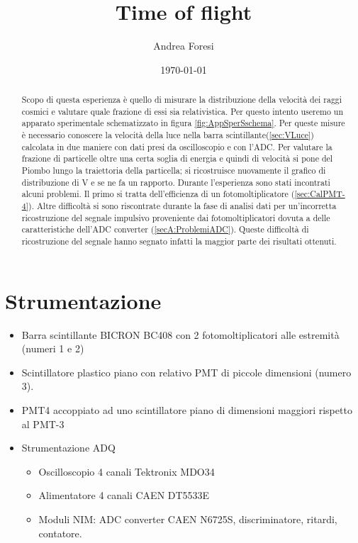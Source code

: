 \documentclass[a4paper]{article}
\title{Time of flight}
\author{Andrea Foresi}
\date{\today}
\begin{document}
\maketitle
\tableofcontents



\begin{abstract}
Scopo di questa esperienza è quello di misurare la distribuzione della velocità dei raggi cosmici e valutare quale frazione di essi sia relativistica. Per questo intento useremo un apparato sperimentale schematizzato in figura \ref{fig:AppSperSschema}. Per queste misure è necessario conoscere la velocità della luce nella barra scintillante(\ref{sec:VLuce}) calcolata in due maniere con dati presi da oscilloscopio e con l'ADC. Per valutare la frazione di particelle oltre una certa soglia di energia e quindi di velocità si pone del Piombo lungo la traiettoria della particella; si ricostruisce nuovamente il grafico di distribuzione di V e se ne fa un rapporto. Durante l'esperienza sono stati incontrati alcuni problemi. Il primo si tratta dell'efficienza di un fotomoltiplicatore (\ref{sec:CalPMT-4}). Altre difficoltà si sono riscontrate durante la fase di analisi dati per un'incorretta ricostruzione del segnale impulsivo proveniente dai fotomoltiplicatori dovuta a delle caratteristiche dell'ADC converter (\ref{secA:ProblemiADC}). Queste difficoltà di ricostruzione del segnale hanno segnato infatti la maggior parte dei risultati ottenuti.
\end{abstract}


\section{Strumentazione}
\label{sec:AppSper}
\begin{itemize}
\item Barra scintillante BICRON BC408 con 2 fotomoltiplicatori alle estremità (numeri 1 e 2)
\item Scintillatore plastico piano con relativo PMT di piccole dimensioni (numero 3). 
\item PMT4 accoppiato ad uno scintillatore piano di dimensioni maggiori rispetto al PMT-3
\item Strumentazione ADQ
\begin{itemize}
    \item Oscilloscopio 4 canali Tektronix MDO34
    \item Alimentatore 4 canali CAEN DT5533E
    \item Moduli NIM: ADC converter CAEN N6725S, discriminatore, ritardi, contatore.
\end{itemize}
\end{itemize}
\end{document}
